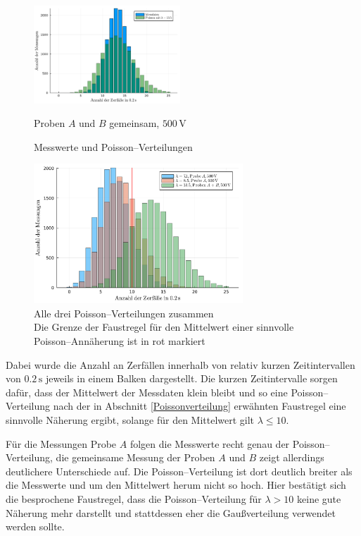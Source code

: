 \documentclass[12pt,a4paper]{scrartcl}
\numberwithin{equation}{section} %
\begin{document}
\begin{figure}
	\includegraphics[width=0.49\textwidth]{../media/B3.1/poisson3.pdf}
	\caption*{Proben $A$ und $B$ gemeinsam, $500 \mathrm{\, V}$}
	\vspace{3pt}
	
	\caption{Messwerte und Poisson--Verteilungen}
	\label{fig:poisson single}
	\vspace{12pt}
	
	\includegraphics[width=0.7\textwidth]{../media/B3.1/allePoisson.pdf}
	\caption{Alle drei Poisson--Verteilungen zusammen\\
		Die Grenze der Faustregel für den Mittelwert einer sinnvolle Poisson--Annäherung ist in rot markiert}
	\label{fig:allePoisson}	
\end{figure}

\noindent
Dabei wurde die Anzahl an Zerfällen innerhalb von relativ kurzen Zeitintervallen von $0.2 \mathrm{\,s}$ jeweils in einem Balken dargestellt. Die kurzen Zeitintervalle sorgen dafür, dass der Mittelwert der Messdaten klein bleibt und so eine Poisson--Verteilung nach der in Abschnitt \ref{Poissonverteilung} erwähnten Faustregel eine sinnvolle Näherung ergibt, solange für den Mittelwert gilt $\lambda \leq 10$.

Für die Messungen  Probe $A$ folgen die Messwerte recht genau der Poisson--Verteilung, die gemeinsame Messung der Proben $A$ und $B$ zeigt allerdings deutlichere Unterschiede auf. Die Poisson--Verteilung ist dort deutlich breiter als die Messwerte und um den Mittelwert herum nicht so hoch. Hier bestätigt sich die besprochene Faustregel, dass die Poisson--Verteilung für $\lambda > 10$ keine gute Näherung mehr darstellt und stattdessen eher die Gaußverteilung verwendet werden sollte.
\end{document}
